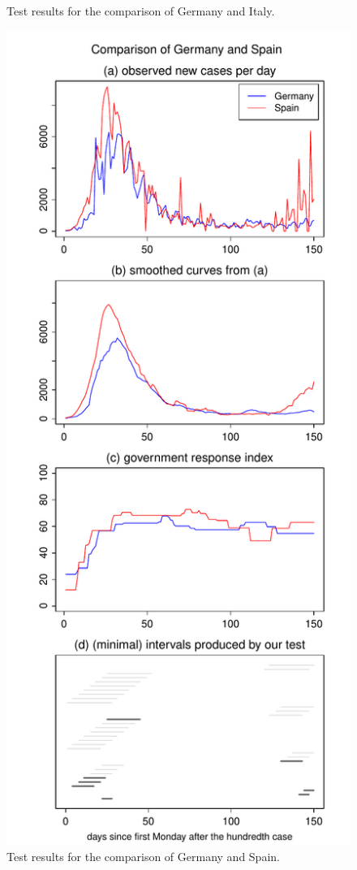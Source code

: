 \documentclass[a4paper,12pt]{article}
\numberwithin{equation}{section}
\begin{document}
\begin{figure}[p!]
\begin{minipage}[t]{0.49\textwidth}
\caption{Test results for the comparison of Germany and Italy.}\label{fig:Germany:Italy}
\end{minipage}
\hspace{0.25cm}
\begin{minipage}[t]{0.49\textwidth}
\includegraphics[width=\textwidth]{plots/DEU_vs_ESP}
\caption{Test results for the comparison of Germany and Spain.}\label{fig:Germany:Spain}
\end{minipage}


\end{figure}
\end{document}
